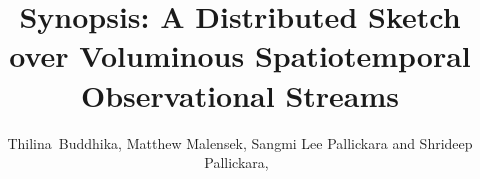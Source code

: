 \documentclass[9pt,journal,compsoc]{IEEEtran}
\begin{document}

\title{Synopsis: A Distributed Sketch over Voluminous Spatiotemporal Observational Streams}

\author{Thilina~Buddhika, Matthew Malensek, Sangmi Lee Pallickara and Shrideep Pallickara,~%
}

\maketitle

\IEEEdisplaynontitleabstractindextext







\vspace{1em}\\


\end{document}
